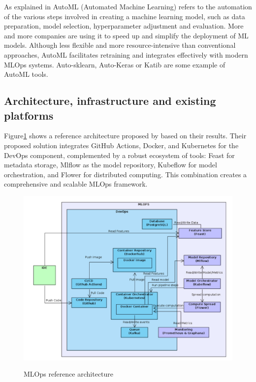 As explained in\cite{mlops-definition-tools-and-challenge} AutoML (Automated Machine Learning) refers to the automation of the various steps involved in creating a machine learning model,
such as data preparation, model selection, hyperparameter adjustment and evaluation.
More and more companies are using it to speed up and simplify the deployment of ML models.
Although less flexible and more resource-intensive than conventional approaches, AutoML facilitates retraining and integrates effectively with modern MLOps systems.
Auto-sklearn, Auto-Keras or Katib are some example of AutoML tools.



\subsection{Architecture, infrastructure and existing platforms}\label{subsec:architecture-infrastructure-and-existing-platforms}
Figure\ref{fig:infra} shows a reference architecture proposed by\cite{10855428} based on their results.
Their proposed solution integrates GitHub Actions, Docker, and Kubernetes for the DevOps component, complemented by a robust ecosystem of tools:
Feast for metadata storage, Mlflow as the model repository, Kubeflow for model orchestration, and Flower for distributed computing.
This combination creates a comprehensive and scalable MLOps framework.

\begin{figure}[!htbp]
    \caption{MLOps reference architecture\cite{10855428}}
    \centering
    \includegraphics[scale=0.35]{images/infrastructure}
    \label{fig:infra}
\end{figure}


